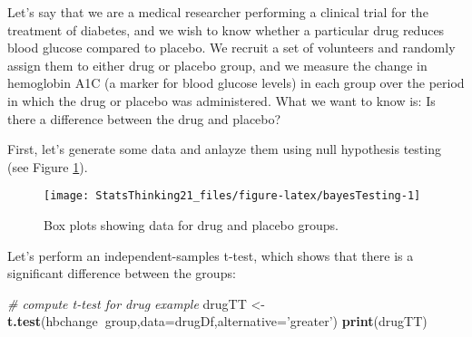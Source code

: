 \documentclass[]{book}
\newenvironment{Shaded}{\begin{snugshade}}{\end{snugshade}}
\newcommand{\KeywordTok}[1]{\textcolor[rgb]{0.13,0.29,0.53}{\textbf{#1}}}
\newcommand{\DataTypeTok}[1]{\textcolor[rgb]{0.13,0.29,0.53}{#1}}
\newcommand{\DecValTok}[1]{\textcolor[rgb]{0.00,0.00,0.81}{#1}}
\newcommand{\FloatTok}[1]{\textcolor[rgb]{0.00,0.00,0.81}{#1}}
\newcommand{\StringTok}[1]{\textcolor[rgb]{0.31,0.60,0.02}{#1}}
\newcommand{\CommentTok}[1]{\textcolor[rgb]{0.56,0.35,0.01}{\textit{#1}}}
\newcommand{\OperatorTok}[1]{\textcolor[rgb]{0.81,0.36,0.00}{\textbf{#1}}}
\newcommand{\NormalTok}[1]{#1}
\theoremstyle{definition}
\theoremstyle{definition}
\theoremstyle{definition}
\theoremstyle{remark}
\begin{document}
Let's say that we are a medical researcher performing a clinical trial
for the treatment of diabetes, and we wish to know whether a particular
drug reduces blood glucose compared to placebo. We recruit a set of
volunteers and randomly assign them to either drug or placebo group, and
we measure the change in hemoglobin A1C (a marker for blood glucose
levels) in each group over the period in which the drug or placebo was
administered. What we want to know is: Is there a difference between the
drug and placebo?

First, let's generate some data and anlayze them using null hypothesis
testing (see Figure \ref{fig:bayesTesting}).

\begin{Shaded}
\end{Shaded}

\begin{figure}
\texttt{[image: StatsThinking21\_files/figure-latex/bayesTesting-1]} \caption{Box plots showing data for drug and placebo groups.}\label{fig:bayesTesting}
\end{figure}

Let's perform an independent-samples t-test, which shows that there is a
significant difference between the groups:

\begin{Shaded}
\begin{Highlighting}[]
\CommentTok{# compute t-test for drug example}
\NormalTok{drugTT <-}\StringTok{ }\KeywordTok{t.test}\NormalTok{(hbchange}\OperatorTok{~}\NormalTok{group,}\DataTypeTok{data=}\NormalTok{drugDf,}\DataTypeTok{alternative=}\StringTok{'greater'}\NormalTok{)}
\KeywordTok{print}\NormalTok{(drugTT)}
\end{Highlighting}
\end{Shaded}
\end{document}
